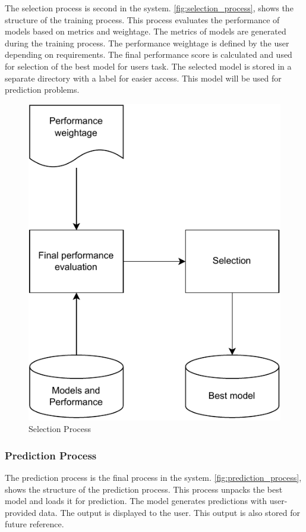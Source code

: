 The selection process is second in the system. \autoref{fig:selection_process}, shows the structure of the training process. This process evaluates the performance of models based on metrics and weightage. The metrics of models are generated during the training process. The performance weightage is defined by the user depending on requirements. The final performance score is calculated and used for selection of the best model for users task. The selected model is stored in a separate directory with a label for easier access. This model will be used for prediction problems.

\begin{figure}[ht]
    \centering
    \includegraphics[width=0.6\columnwidth]{media/sec03/selection.pdf}
    \caption{Selection Process}
    \label{fig:selection_process}
\end{figure}

\subsubsection{Prediction Process}\label{subsubsec:prediction_process}

The prediction process is the final process in the system. \autoref{fig:prediction_process}, shows the structure of the prediction process. This process unpacks the best model and loads it for prediction. The model generates predictions with user-provided data. The output is displayed to the user. This output is also stored for future reference.


